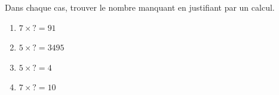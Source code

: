 \documentclass[exercice]{thedocument}%
\begin{document}
%
Dans chaque cas, trouver le nombre manquant en justifiant par un calcul.
\begin{enumerate}
    \item $7\times?=91$
    \item $5\times?=3495$
    \item $5\times?=4$
    \item $7\times?=10$
\end{enumerate}
\end{document}

